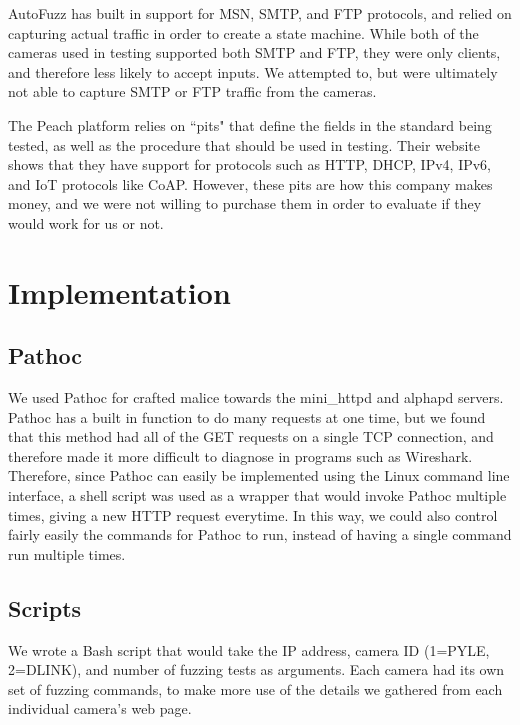 \documentclass[letterpaper,twocolumn,10pt]{article}
\begin{document}
AutoFuzz has built in support for MSN, SMTP, and FTP protocols, and relied on capturing actual traffic in order to create a state machine. While both of the cameras used in testing supported both SMTP and FTP, they were only clients, and therefore less likely to accept inputs. We attempted to, but were ultimately not able to capture SMTP or FTP traffic from the cameras.

The Peach platform relies on ``pits" that define the fields in the standard being tested, as well as the procedure that should be used in testing. Their website shows that they have support for protocols such as HTTP, DHCP, IPv4, IPv6, and IoT protocols like CoAP. However, these pits are how this company makes money, and we were not willing to purchase them in order to evaluate if they would work for us or not.


\section{Implementation}

\subsection{Pathoc}
We used Pathoc for crafted malice towards the mini\_httpd and alphapd servers. Pathoc has a built in function to do many requests at one time, but we found that this method had all of the GET requests on a single TCP connection, and therefore made it more difficult to diagnose in programs such as Wireshark. Therefore, since Pathoc can easily be implemented using the Linux command line interface, a shell script was used as a wrapper that would invoke Pathoc multiple times, giving a new HTTP request everytime. In this way, we could also control fairly easily the commands for Pathoc to run, instead of having a single command run multiple times.



\subsection{Scripts}
We wrote a Bash script that would take the IP address, camera ID (1=PYLE, 2=DLINK), and number of fuzzing tests as arguments. Each camera had its own set of fuzzing commands, to make more use of the details we gathered from each individual camera's web page.
\end{document}
